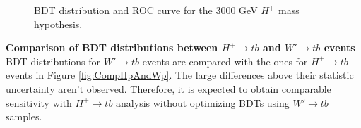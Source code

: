 \begin{description}
    \begin{figure}[H]
      \centering
      \caption{BDT distribution and ROC curve for the 3000 GeV $H^{+}$ mass hypothesis.}
      \label{fig:BDTTrainingResults_Hp3000}
    \end{figure}

    \item{\textbf{Comparison of BDT distributions between $H^{+} \rightarrow tb$ and  $W' \rightarrow tb$ events}}\mbox{}\\
    BDT distributions for $W' \rightarrow tb$ events are compared with the ones for $H^{+} \rightarrow tb$ events in Figure \ref{fig:CompHpAndWp}. The large differences above their statistic uncertainty aren't observed. Therefore, it is expected to obtain comparable sensitivity with $H^{+} \rightarrow tb$ analysis without optimizing BDTs using $W' \rightarrow tb$ samples.


\end{description}
